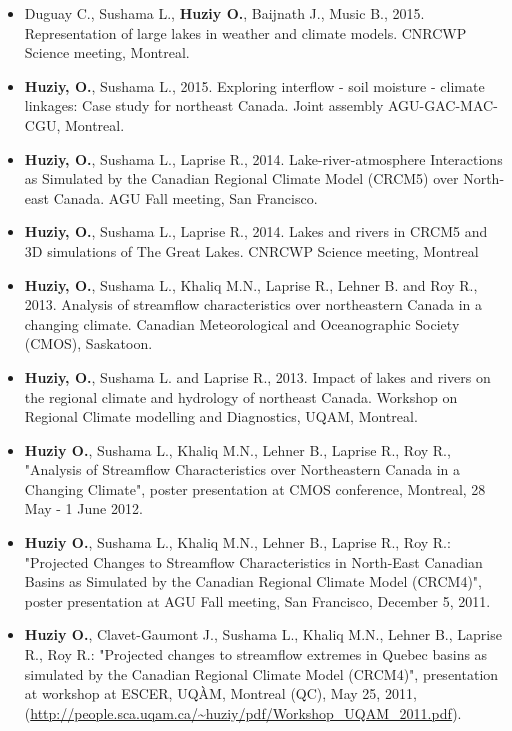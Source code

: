 
\vspace{0.5cm}
\begin{itemize}


   \item Duguay C., Sushama L., \textbf{Huziy O.}, Baijnath J., Music B., 2015.
   Representation of large lakes in weather and climate models. CNRCWP Science
   meeting, Montreal.

   \item \textbf{Huziy, O.}, Sushama L., 2015. Exploring interflow - soil moisture - climate
   linkages: Case study for northeast Canada. Joint assembly AGU-GAC-MAC-CGU, Montreal.

   \item \textbf{Huziy, O.}, Sushama L., Laprise R., 2014. Lake-river-atmosphere Interactions
   as Simulated by the Canadian Regional Climate Model (CRCM5) over North-east
   Canada. AGU Fall meeting, San Francisco.

   \item \textbf{Huziy, O.}, Sushama L., Laprise R., 2014. Lakes and rivers in
   CRCM5 and 3D simulations of The Great Lakes. CNRCWP Science meeting, Montreal

   \item \textbf{Huziy, O.}, Sushama L., Khaliq M.N., Laprise R., Lehner B. and Roy
    R., 2013. Analysis of streamflow characteristics over northeastern Canada in a
    changing climate. Canadian Meteorological and Oceanographic Society (CMOS),
    Saskatoon.

   \item \textbf{Huziy, O.}, Sushama L. and Laprise R., 2013. Impact of lakes
   and rivers on the regional climate and hydrology of northeast Canada.
   Workshop on Regional Climate modelling and Diagnostics, UQAM, Montreal.

    \item \textbf{Huziy O.}, Sushama L., Khaliq M.N., Lehner B., Laprise R., Roy
    R., "Analysis of Streamflow Characteristics over Northeastern Canada in a
    Changing Climate", poster presentation at CMOS conference, Montreal, 28 May -
    1 June 2012.

    \item \textbf{Huziy O.}, Sushama L., Khaliq M.N., Lehner B., Laprise R., Roy
    R.: "Projected Changes to Streamflow Characteristics in North-East Canadian
    Basins as Simulated by the Canadian Regional Climate Model (CRCM4)", poster
    presentation at AGU Fall meeting, San Francisco, December 5, 2011.

    \item \textbf{Huziy O.}, Clavet-Gaumont J., Sushama L., Khaliq M.N., Lehner
    B., Laprise R., Roy R.: "Projected changes to streamflow extremes in Quebec
    basins as simulated by the Canadian Regional Climate Model (CRCM4)",
    presentation at workshop at ESCER, UQÀM, Montreal (QC), May 25, 2011,
    (\url{http://people.sca.uqam.ca/~huziy/pdf/Workshop_UQAM_2011.pdf}).


\end{itemize}
